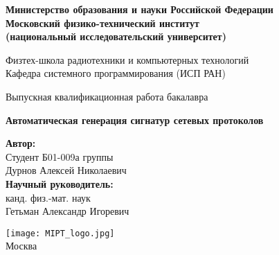 \begin{center}

    \large\textbf{Министерство образования и науки Российской Федерации \\
    Московский физико-технический институт \\
    (национальный исследовательский университет)} \\
    \vspace{1cm}


    Физтех-школа радиотехники и компьютерных технологий \\

    Кафедра системного программирования (ИСП РАН) \\

    \vspace{3em}

    Выпускная квалификационная работа бакалавра
\end{center}

\begin{center}
    \vspace{\fill}
    \textbf{{\fontsize{23}{27}\selectfont Автоматическая генерация сигнатур сетевых протоколов}}
    \vspace{\fill}
\end{center}


\begin{flushright}
    \textbf{Автор:} \\
    Студент Б01-009а группы \\
    Дурнов Алексей Николаевич \\
    \vspace{2em}
    \textbf{Научный руководитель:} \\
    канд. физ.-мат. наук \\
    Гетьман Александр Игоревич \\
\end{flushright}

\vspace{7em}

\begin{center}
    \texttt{[image: MIPT\_logo.jpg]}\\
    Москва \the\year{}
\end{center}

\thispagestyle{empty}
\newpage
\setcounter{page}{2}
\fancyfoot[c]{\thepage}
\fancyhead[L]{}
\fancyhead[R]{}
\fancyhead[C]{}
\renewcommand{\headrulewidth}{0pt}
